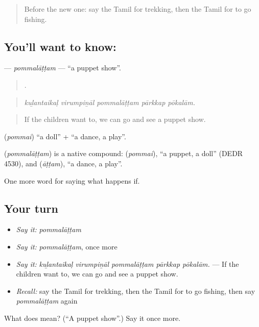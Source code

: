 \label{lesson:TA-C554-pommalattam}



\begin{quote}
Before the new one: say the Tamil for trekking, then the Tamil for to go fishing.
\end{quote}

\subsection*{You'll want to know: }
\textbf{} — \emph{pommalāṭṭam} — \textquotedblleft{}a puppet show\textquotedblright{}.

\begin{quote}
    .
\end{quote}

\begin{quote}
\emph{kuḻantaikaḷ virumpiṉāl pommalāṭṭam pārkkap pōkalām.}
\end{quote}

\begin{quote}
If the children want to, we can go and see a puppet show.
\end{quote}

 (\emph{pommai}) \textquotedblleft{}a doll\textquotedblright{} +  \textquotedblleft{}a dance, a play\textquotedblright{}.

\begin{cousinweb}
\textbf{} (\emph{pommalāṭṭam}) is a native compound:  (\emph{pommai}), \textquotedblleft{}a puppet, a doll\textquotedblright{} (DEDR 4530), and  (\emph{āṭṭam}), \textquotedblleft{}a dance, a play\textquotedblright{}.
\end{cousinweb}

\begin{grammarlens}[title={What you've built}]
One more word for saying what happens if.
\end{grammarlens}

\subsection*{Your turn}
\begin{itemize}
\raggedright
  \item \emph{Say it:} \emph{pommalāṭṭam}
  \item \emph{Say it:} \emph{pommalāṭṭam}, once more
  \item \emph{Say it:} \emph{kuḻantaikaḷ virumpiṉāl pommalāṭṭam pārkkap pōkalām.} — If the children want to, we can go and see a puppet show.
  \item \emph{Recall:} say the Tamil for trekking, then the Tamil for to go fishing, then say \emph{pommalāṭṭam} again
\end{itemize}

\begin{tcolorbox}[breakable,colback=teal!4,colframe=teal!35!black,title={Before you move on}]
What does  mean? (\textquotedblleft{}A puppet show\textquotedblright{}.) Say it once more.
\end{tcolorbox}
